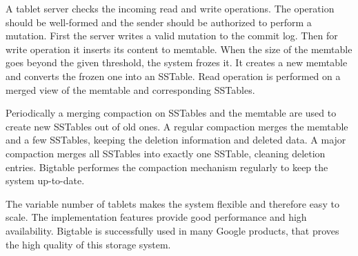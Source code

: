 A tablet server checks the incoming read and write operations.
The operation should be well-formed and the sender should be authorized to perform a mutation.
First the server writes a valid mutation to the commit log.
Then for write operation it inserts its content to memtable.
When the size of the memtable goes beyond the given threshold, the system frozes it.
It creates a new memtable and converts the frozen one into an SSTable. 
Read operation is performed on a merged view of the memtable and corresponding SSTables.

Periodically a merging compaction on SSTables and the memtable are used to create new SSTables out of old ones.
A regular compaction merges the memtable and a few SSTables, keeping the deletion information and deleted data.
A major compaction merges all SSTables into exactly one SSTable, cleaning deletion entries.
Bigtable performes the compaction mechanism regularly to keep the system up-to-date.

The variable number of tablets makes the system flexible and therefore easy to scale.
The implementation features provide good performance and high availability.
Bigtable is successfully used in many Google products, that proves the high quality of this storage system.